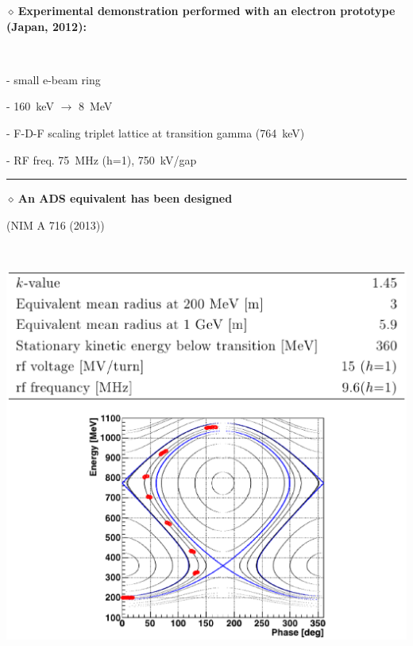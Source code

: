 \documentclass[12pt]{article}
\newcommand{\nid}{\noindent \ensuremath{\diamond~}}
\newcommand{\black}{\color{black}}
\newcommand{\blue}{\color{blue}}
\begin{document}
\begin{minipage}{.38\linewidth}


\blue

\nid \bf Experimental demonstration performed with an electron prototype (Japan, 2012): 

\black

~

- small e-beam ring

- 160~keV $\rightarrow$ 8~MeV

- F-D-F scaling triplet lattice at transition gamma
 (764~keV) 

- RF freq. 75~MHz (h=1), 750~kV/gap
\end{minipage}\hspace{3ex}
\begin{minipage}{.01\linewidth}
\rule{0.1mm}{140mm}
\end{minipage}\hspace{0ex}
\begin{minipage}{.51\linewidth}

\centering

\blue
\nid \bf An ADS equivalent has been designed

(NIM A 716 (2013))

\black

~

\rm

\includegraphics[width=1.\linewidth]{./figs_FFAG_introSlides/serpentineEmi.eps}
\end{minipage}
\end{document}

